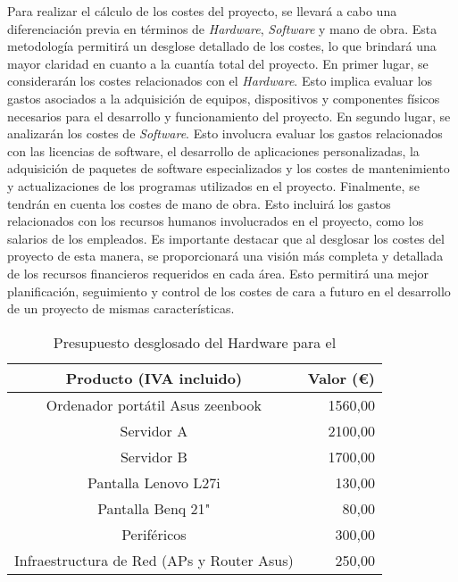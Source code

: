 Para realizar el cálculo de los costes del proyecto, se llevará a cabo una diferenciación previa en términos de \textit{Hardware}, \textit{Software} y mano de obra. Esta metodología permitirá un desglose detallado de los costes, lo que brindará una mayor claridad en cuanto a la cuantía total del proyecto.  En primer lugar, se considerarán los costes relacionados con el \textit{Hardware}. Esto implica evaluar los gastos asociados a la adquisición de equipos, dispositivos y componentes físicos necesarios para el desarrollo y funcionamiento del proyecto. En segundo lugar, se analizarán los costes de \textit{Software}. Esto involucra evaluar los gastos relacionados con las licencias de software, el desarrollo de aplicaciones personalizadas, la adquisición de paquetes de software especializados y los costes de mantenimiento y actualizaciones de los programas utilizados en el proyecto. Finalmente, se tendrán en cuenta los costes de mano de obra. Esto incluirá los gastos relacionados con los recursos humanos involucrados en el proyecto, como los salarios de los empleados. Es importante destacar que al desglosar los costes del proyecto de esta manera, se proporcionará una visión más completa y detallada de los recursos financieros requeridos en cada área. Esto permitirá una mejor planificación, seguimiento y control de los costes de cara a futuro en el desarrollo de un proyecto de mismas características.

\begin{table}[ht]
	\centering
	\begin{tabular}{|c|r|}
		\hline
		\rowcolor[HTML]{EFEFEF}
		\textbf{Producto (IVA incluido)}           & \multicolumn{1}{c|}{\cellcolor[HTML]{EFEFEF}\textbf{Valor (€)}} \\ \hline
		Ordenador portátil Asus zeenbook           & 1560,00                                                         \\ \hline
		Servidor  A                                & 2100,00                                                         \\ \hline
		Servidor  B                                & 1700,00                                                         \\ \hline
		Pantalla Lenovo L27i                       & 130,00                                                          \\ \hline
		Pantalla Benq 21"                          & 80,00                                                           \\ \hline
		Periféricos                                & 300,00                                                          \\ \hline
		Infraestructura de Red (APs y Router Asus) & 250,00                                                          \\ \hline
	\end{tabular}
	\caption{Presupuesto desglosado del Hardware para el }
	\label{tab:costesHardware}
\end{table}

